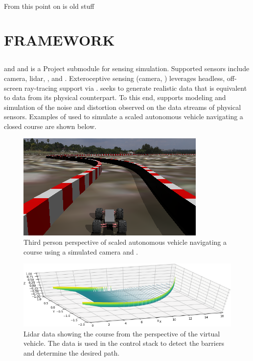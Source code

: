 
\clearpage
From this point on is old stuff
\section{FRAMEWORK}\label{s:framework}


\subsection{}\label{s:ChSensor}

\chrono{} and \synchrono{} and   is a Project \chrono{} submodule for sensing simulation. Supported sensors include camera, lidar, \gps{}, and \imu{}. Exteroceptive sensing (camera, \lidar{}) leverages headless, off-screen ray-tracing support via \optix{}.  seeks to generate realistic data that is equivalent to data from its physical counterpart. To this end,  supports modeling and simulation of the noise and distortion observed on the data streams of physical sensors. Examples of  used to simulate a scaled autonomous vehicle navigating a closed course are shown below.

\begin{figure}
	\centering
	\includegraphics[width=0.8\columnwidth]{Figs/AV-third-person.png}
	\caption{{\small Third person perspective of scaled autonomous vehicle navigating a course using a simulated camera and \lidar{}.}}   
	\label{fig:avthirdperson}
\end{figure}

\begin{figure}
	\centering
	\includegraphics[width=0.8\columnwidth]{Figs/AV-lidar.png}
	\caption{{\small Lidar data showing the course from the perspective of the virtual vehicle. The data is used in the control stack to detect the barriers and determine the desired path.}}   
	\label{fig:avlidar}
\end{figure}

